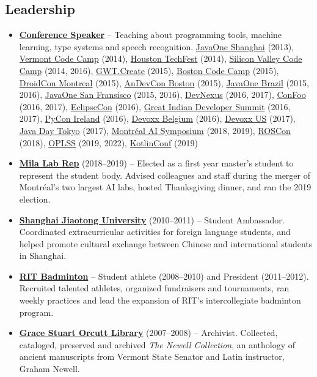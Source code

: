 \documentclass[letterpaper,11pt]{article}
\newcommand{\resumeItem}[2]{
  \item\small{\textbf{#1}{ #2 }}
}
\newcommand{\resumeSubItem}[2]{\resumeItem{#1}{#2}}
\newcommand{\resumeSubHeadingListStart}{\begin{itemize}[leftmargin=*]}
\newcommand{\resumeSubHeadingListEnd}{\end{itemize}}
\begin{document}
\begin{justify}
\section{Leadership}
\resumeSubHeadingListStart
\resumeSubItem{\href{https://speakerdeck.com/breandan}{Conference Speaker}} {-- Teaching about programming tools, machine learning, type systems and speech recognition.
\href{https://oracle.com/javaone}{JavaOne Shanghai} (2013),
\href{https://www.vtcodecamp.org/}{Vermont Code Camp} (2014),
\href{http://houstontechfest.com/}{Houston TechFest} (2014),
\href{https://svcc.mobi/}{Silicon Valley Code Camp} (2014, 2016),
\href{http://gwtcreate.com/}{GWT.Create} (2015),
\href{https://www.bostoncodecamp.com/}{Boston Code Camp} (2015),
\href{https://www.droidcon.com/}{DroidCon Montreal} (2015),
\href{http://www.andevcon.com/}{AnDevCon Boston} (2015),
\href{https://oracle.com/javaone}{JavaOne Brazil} (2015, 2016),
\href{https://oracle.com/javaone}{JavaOne San Fransisco} (2015, 2016),
\href{https://devnexus.com/}{DevNexus} (2016, 2017),
\href{https://confoo.ca}{ConFoo} (2016, 2017),
\href{https://www.eclipsecon.org/na2016}{EclipseCon} (2016),
\href{https://www.developersummit.com/}{Great Indian Developer Summit} (2016, 2017),
\href{https://python.ie}{PyCon Ireland} (2016),
\href{https://devoxx.com/}{Devoxx Belgium} (2016),
\href{https://devoxx.com/}{Devoxx US} (2017),
\href{https://www.oracle.co.jp/events/javaday/2017/}{Java Day Tokyo} (2017),
\href{http://montrealaisymposium.com/}{Montr\'eal AI Symposium} (2018, 2019),
\href{https://roscon.ros.org}{ROSCon} (2018),
\href{https://www.cs.uoregon.edu/research/summerschool/summer19/topics.php}{OPLSS} (2019, 2022),
\href{https://kotlinconf.com/}{KotlinConf} (2019)
}
\resumeSubItem{\href{https://mila.quebec/}{Mila Lab Rep}} {(2018--2019) -- Elected as a first year master's student to represent the student body. Advised colleagues and staff during the merger of Montr\'eal's two largest AI labs, hosted Thanksgiving dinner, and ran the 2019 election.}
\resumeSubItem{\href{https://www.sjtu.edu.cn/}{Shanghai Jiaotong University}} {(2010--2011) -- Student Ambassador. Coordinated extracurricular activities for foreign language students, and helped promote cultural exchange between Chinese and international students in Shanghai.}
\resumeSubItem{\href{https://www.rit.edu/sg/badminton/}{RIT Badminton}} {-- Student athlete (2008--2010) and President (2011--2012). Recruited talented athletes, organized fundraisers and tournaments, ran weekly practices and lead the expansion of RIT's intercollegiate badminton program.}
\resumeSubItem{\href{https://www.stjacademy.org/academics/library}{Grace Stuart Orcutt Library}} {(2007--2008) -- Archivist. Collected, cataloged, preserved and archived \textit{The Newell Collection}, an anthology of ancient manuscripts from Vermont State Senator and Latin instructor, Graham Newell.}
\resumeSubHeadingListEnd


\end{justify}
\end{document}
